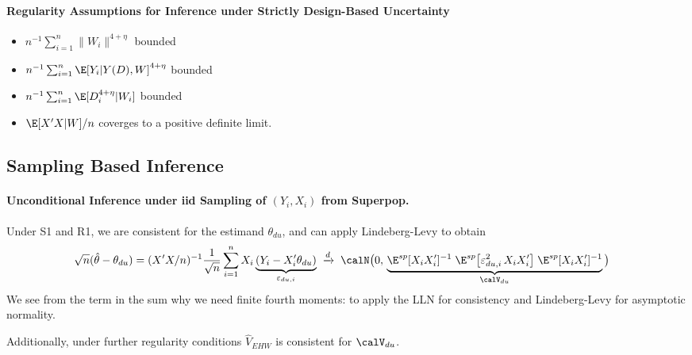\documentclass[12pt]{article}
\theoremstyle{plain}
\theoremstyle{definition}
\theoremstyle{remark}
\newcommand{\dto}{\xrightarrow{d}}
\newcommand{\sumin}{\sum^n_{i=1}}
\begin{document}
\paragraph{Regularity Assumptions for Inference under Strictly Design-Based Uncertainty}
\begin{itemize}
  \item $n^{-1}\sumin \lVert W_i\rVert^{4+\eta}$ bounded
  \item $n^{-1}\sumin \E[Y_i|Y(D),W]^{4+\eta}$ bounded
  \item $n^{-1}\sumin \E[D_i^{4+\eta}|W_i]$ bounded
  \item $\E[X'X|W]/n$ coverges to a positive definite limit.
\end{itemize}


\clearpage
\subsection{Sampling Based Inference}

\paragraph{Unconditional Inference under iid Sampling of $(Y_i,X_i)$ from Superpop.}
Under S1 and R1, we are consistent for the estimand $\theta_{du}$,
and can apply Lindeberg-Levy to obtain
\begin{align*}
  \sqrt{n}(\hat{\theta}-\theta_{du})
  =
  (X'X/n)^{-1}
  \frac{1}{\sqrt{n}}
  \sumin
  X_i
  \underbrace{%
    (Y_i-X_i'\theta_{du})
  }_{\varepsilon_{du,i}}
  &
  \; \dto\;
  \calN\big(
    0,\,
    \underbrace{%
    \E^{sp}[X_iX_i']^{-1}
    \;
    \E^{sp}\big[\varepsilon^2_{du,i}\,X_iX_i'\big]
    \;
    \E^{sp}[X_iX_i']^{-1}
    }_{\calV_{du}}
  \big)
\end{align*}
We see from the term in the sum why we need finite fourth moments:
to apply the LLN for consistency and Lindeberg-Levy for asymptotic
normality.

Additionally, under further regularity conditions $\hat{V}_{EHW}$ is
consistent for $\calV_{du}$.
\end{document}

